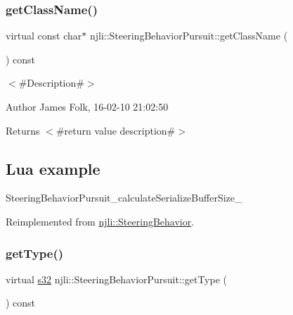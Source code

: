 \subsubsection{\texorpdfstring{get\+Class\+Name()}{getClassName()}}
{\footnotesize\ttfamily virtual const char$\ast$ njli\+::\+Steering\+Behavior\+Pursuit\+::get\+Class\+Name (\begin{DoxyParamCaption}{ }\end{DoxyParamCaption}) const\hspace{0.3cm}{\ttfamily [virtual]}}



$<$\#\+Description\#$>$ 

\begin{DoxyAuthor}{Author}
James Folk, 16-\/02-\/10 21\+:02\+:50
\end{DoxyAuthor}
\begin{DoxyReturn}{Returns}
$<$\#return value description\#$>$
\end{DoxyReturn}
\hypertarget{classnjli_1_1_steering_behavior_wander_ex1}{}\subsection{Lua example}\label{classnjli_1_1_steering_behavior_wander_ex1}

\begin{DoxyCodeInclude}
\end{DoxyCodeInclude}
Steering\+Behavior\+Pursuit\+\_\+calculate\+Serialize\+Buffer\+Size\+\_\+ 

Reimplemented from \mbox{\hyperlink{classnjli_1_1_steering_behavior_abb58d6982dc295fc3e90f096f51b0ef8}{njli\+::\+Steering\+Behavior}}.

\mbox{\label{classnjli_1_1_steering_behavior_pursuit_a3921ed320793fa7e5efb3125b7a23569}} 
\subsubsection{\texorpdfstring{get\+Type()}{getType()}}
{\footnotesize\ttfamily virtual \mbox{\hyperlink{_util_8h_aa62c75d314a0d1f37f79c4b73b2292e2}{s32}} njli\+::\+Steering\+Behavior\+Pursuit\+::get\+Type (\begin{DoxyParamCaption}{ }\end{DoxyParamCaption}) const\hspace{0.3cm}{\ttfamily [virtual]}}



